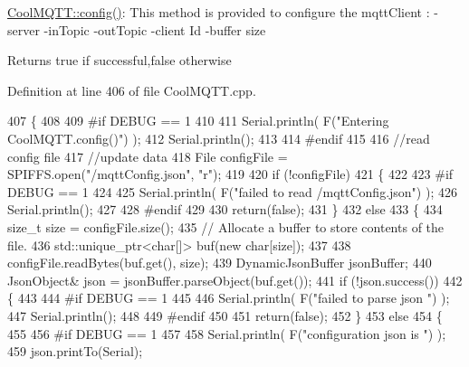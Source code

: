 \hyperlink{class_cool_m_q_t_t_a6571671781a505feca9a8a56e256c6bc}{Cool\+M\+Q\+T\+T\+::config()}\+: This method is provided to configure the mqtt\+Client \+: -\/server -\/in\+Topic -\/out\+Topic -\/client Id -\/buffer size

\begin{DoxyReturn}{Returns}
true if successful,false otherwise 
\end{DoxyReturn}


Definition at line 406 of file Cool\+M\+Q\+T\+T.\+cpp.


\begin{DoxyCode}
407 \{
408 
409 \textcolor{preprocessor}{#if DEBUG == 1 }
410 
411     Serial.println( F(\textcolor{stringliteral}{"Entering CoolMQTT.config()"}) );
412     Serial.println();
413 
414 \textcolor{preprocessor}{#endif}
415 
416     \textcolor{comment}{//read config file}
417     \textcolor{comment}{//update data}
418     File configFile = SPIFFS.open(\textcolor{stringliteral}{"/mqttConfig.json"}, \textcolor{stringliteral}{"r"});
419 
420     \textcolor{keywordflow}{if} (!configFile) 
421     \{
422     
423 \textcolor{preprocessor}{    #if DEBUG == 1 }
424 
425         Serial.println( F(\textcolor{stringliteral}{"failed to read /mqttConfig.json"}) );
426         Serial.println();
427 
428 \textcolor{preprocessor}{    #endif}
429 
430         \textcolor{keywordflow}{return}(\textcolor{keyword}{false});
431     \}
432     \textcolor{keywordflow}{else}
433     \{
434         \textcolor{keywordtype}{size\_t} size = configFile.size();
435         \textcolor{comment}{// Allocate a buffer to store contents of the file.}
436         std::unique\_ptr<char[]> buf(\textcolor{keyword}{new} \textcolor{keywordtype}{char}[size]);
437 
438         configFile.readBytes(buf.get(), size);
439         DynamicJsonBuffer jsonBuffer;
440         JsonObject& json = jsonBuffer.parseObject(buf.get());
441         \textcolor{keywordflow}{if} (!json.success()) 
442         \{
443         
444 \textcolor{preprocessor}{        #if DEBUG == 1 }
445 
446             Serial.println( F(\textcolor{stringliteral}{"failed to parse json "}) );
447             Serial.println();
448         
449 \textcolor{preprocessor}{        #endif}
450             
451             \textcolor{keywordflow}{return}(\textcolor{keyword}{false});
452         \} 
453         \textcolor{keywordflow}{else}
454         \{
455         
456 \textcolor{preprocessor}{        #if DEBUG == 1 }
457         
458             Serial.println( F(\textcolor{stringliteral}{"configuration json is "}) );
459             json.printTo(Serial);

\end{DoxyCode}
